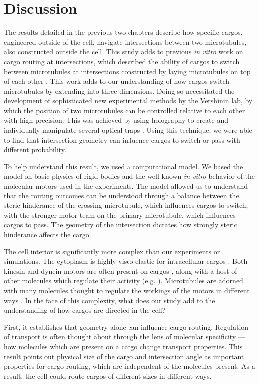 \chapter{Discussion}

The results detailed in the previous two chapters describe how specific cargos, engineered outside of the cell, navigate intersections between two microtubules, also constructed outside the cell.
This study adds to previous \textit{in vitro} work on cargo routing at intersections, which described the ability of cargos to switch between microtubules at intersections constructed by laying microtubules on top of each other \cite{Ross2008}.
This work adds to our understanding of how cargos switch microtubules by extending into three dimensions.
Doing so necessitated the development of sophisticated new experimental methods by the Vershinin lab, by which the position of two microtubules can be controlled relative to each other with high precision.
This was achieved by using holography to create and individually manipulate several optical traps \cite{Bergman2015}.
Using this technique, we were able to find that intersection geometry can influence cargos to switch or pass with different probability.

To help understand this result, we used a computational model.
We based the model on basic physics of rigid bodies and the well-known \textit{in vitro} behavior of the molecular motors used in the experiments.
The model allowed us to understand that the routing outcomes can be understood through a balance between the steric hinderance of the crossing microtubule, which influences cargos to switch, with the stronger motor team on the primary microtubule, which influences cargos to pass.
The geometry of the intersection dictates how strongly steric hinderance affects the cargo.

The cell interior is significantly more complex than our experiments or simulations.
The cytoplasm is highly visco-elastic for intracellular cargos \cite{Guo2014,Ahmed2018}.
Both kinesin and dynein motors are often present on cargos \cite{Gross2004,Hancock2014}, along with a host of other molecules which regulate their activity (e.g. \cite{Reddy2016}).
Microtubules are adorned with many molecules thought to regulate the workings of the motors in different ways \cite{Yu2015,Sirajuddin2014}.
In the face of this complexity, what does our study add to the understanding of how cargos are directed in the cell?

First, it establishes that geometry alone can influence cargo routing.
Regulation of transport is often thought about through the lens of molecular specificity --- how molecules which are present on a cargo change transport properties.
This result points out physical size of the cargo and intersection angle as important properties for cargo routing, which are independent of the molecules present.
As a result, the cell could route cargos of different sizes in different ways.

